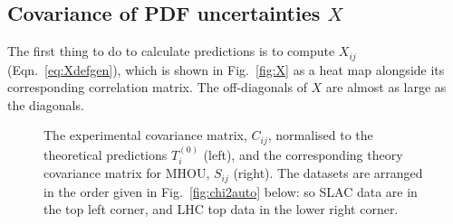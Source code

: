 \subsection{Covariance of PDF uncertainties $X$}
\label{subsec:XnY}
The first thing to do to calculate predictions is to compute $X_{ij}$ (Eqn.~\ref{eq:Xdefgen}), which is shown in Fig.~\ref{fig:X} as a heat map alongside its corresponding correlation matrix. The off-diagonals of $X$ are almost as large as the diagonals. 
 \begin{figure}[H]
    \begin{center}
    \end{center}
  \vspace{-0.55cm}
  \caption{The experimental covariance matrix, $C_{ij}$, normalised to the theoretical predictions $T^{(0)}_i$  (left), and the corresponding theory covariance matrix for MHOU, $S_{ij}$ (right). The datasets are arranged in the order given in Fig.~\ref{fig:chi2auto} below: so SLAC data are in the top left corner, and LHC top data in the lower right corner.}
  \label{fig:CnS}
\end{figure}
